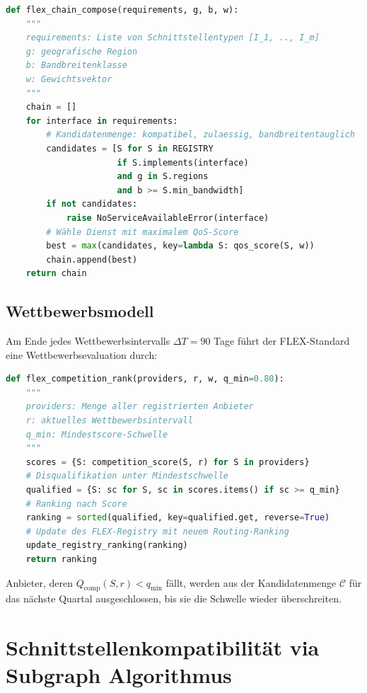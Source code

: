 ﻿\documentclass[a4paper,12pt]{article}
\theoremstyle{definition}
\begin{document}
\begin{lstlisting}[caption={FLEX-CHAIN-COMPOSE: Greedy-Kettenkomposition},label={alg:kette},language=Python]
def flex_chain_compose(requirements, g, b, w):
    """
    requirements: Liste von Schnittstellentypen [I_1, .., I_m]
    g: geografische Region
    b: Bandbreitenklasse
    w: Gewichtsvektor
    """
    chain = []
    for interface in requirements:
        # Kandidatenmenge: kompatibel, zulaessig, bandbreitentauglich
        candidates = [S for S in REGISTRY
                      if S.implements(interface)
                      and g in S.regions
                      and b >= S.min_bandwidth]
        if not candidates:
            raise NoServiceAvailableError(interface)
        # Wähle Dienst mit maximalem QoS-Score
        best = max(candidates, key=lambda S: qos_score(S, w))
        chain.append(best)
    return chain
\end{lstlisting}

\subsection{Wettbewerbsmodell}

Am Ende jedes Wettbewerbsintervalls $\Delta T = 90$ Tage führt der FLEX-Standard eine Wettbewerbsevaluation durch:

\begin{lstlisting}[caption={FLEX-COMPETITION-RANK: Wettbewerbsrankierung},label={alg:wettbewerb},language=Python]
def flex_competition_rank(providers, r, w, q_min=0.80):
    """
    providers: Menge aller registrierten Anbieter
    r: aktuelles Wettbewerbsintervall
    q_min: Mindestscore-Schwelle
    """
    scores = {S: competition_score(S, r) for S in providers}
    # Disqualifikation unter Mindestschwelle
    qualified = {S: sc for S, sc in scores.items() if sc >= q_min}
    # Ranking nach Score
    ranking = sorted(qualified, key=qualified.get, reverse=True)
    # Update des FLEX-Registry mit neuem Routing-Ranking
    update_registry_ranking(ranking)
    return ranking
\end{lstlisting}

Anbieter, deren $Q_\mathrm{comp}(S, r) < q_{\min}$ fällt, werden aus der Kandidatenmenge $\mathcal{C}$ für das nächste Quartal ausgeschlossen, bis sie die Schwelle wieder überschreiten.

\section{Schnittstellenkompatibilität via Subgraph Algorithmus}
\label{sec:subgraph}
\end{document}
